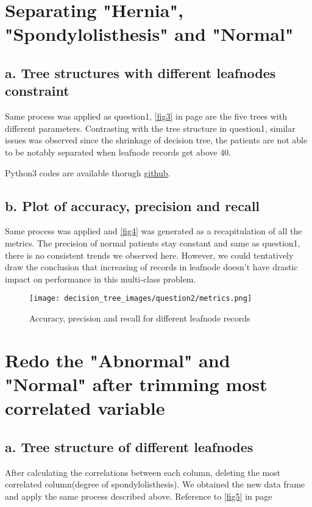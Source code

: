 \documentclass{article}
\begin{document}
\section{Separating "Hernia", "Spondylolisthesis" and "Normal"}
\subsection*{a. Tree structures with different leafnodes constraint}
Same process was applied as question1, \autoref{fig3} in page \pageref{fig3} are the five trees with different parameters. Contrasting with the tree structure in question1, similar issues was observed since the shrinkage of decision tree, the patients are not able to be notably separated when leafnode records get above 40.

Python3 codes are available thorugh \href{https://github.com/frankligy/exercise_codes/blob/master/decision_tree_copy2.py}{github}.


\subsection*{b. Plot of accuracy, precision and recall}
Same process was applied and \autoref{fig4} was generated as a recapitulation of all the metrics. The precision of normal patients stay constant and same as question1, there is no consistent trends we observed here. However, we could tentatively draw the conclusion that increasing of records in leafnode doesn't have drastic impact on performance in this multi-class problem.

\begin{figure}[H]
    \centering
    \texttt{[image: decision\_tree\_images/question2/metrics.png]}
    \caption{Accuracy, precision and recall for different leafnode records}
    \label{fig4}
\end{figure}

\section{Redo the "Abnormal" and "Normal" after trimming most correlated variable}
\subsection*{a. Tree structure of different leafnodes}
After calculating the correlations between each column, deleting the most correlated column(degree of spondylolisthesis). We obtained the new data frame and apply the same process described above. Reference to \autoref{fig5} in page \pageref{fig5}
\end{document}
